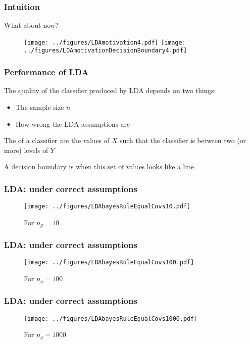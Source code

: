 \documentclass[12pt]{beamer}
\begin{document}
\begin{frame}[fragile]
\frametitle{Intuition}
What about now?
\begin{figure}
\centering
\texttt{[image: ../figures/LDAmotivation4.pdf]} \pause
\texttt{[image: ../figures/LDAmotivationDecisionBoundary4.pdf]}
\end{figure}
\end{frame}



\begin{frame}[fragile]
\frametitle{Performance of LDA}
The quality of the classifier produced by LDA depends on two things:
\vsp

\begin{itemize}
\item The sample size $n$

\item How wrong the LDA assumptions are

\end{itemize}
\vsp

 The  of a classifier are the values of $X$ such that
the classifier is  between two (or more) levels of $Y$

\vsp
A  decision boundary is when this set of values looks like a line
\end{frame}


\begin{frame}[fragile]
\frametitle{LDA: under correct assumptions}
\begin{figure}
\centering
\texttt{[image: ../figures/LDAbayesRuleEqualCovs10.pdf]}
\caption{For $n_g = 10$}
\end{figure}
\end{frame}


\begin{frame}[fragile]
\frametitle{LDA: under correct assumptions}
\begin{figure}
\centering
\texttt{[image: ../figures/LDAbayesRuleEqualCovs100.pdf]}
\caption{For $n_g = 100$}
\end{figure}
\end{frame}

\begin{frame}[fragile]
\frametitle{LDA: under correct assumptions}
\begin{figure}
\centering
\texttt{[image: ../figures/LDAbayesRuleEqualCovs1000.pdf]}
\caption{For $n_g = 1000$}
\end{figure}
\end{frame}
\end{document}
